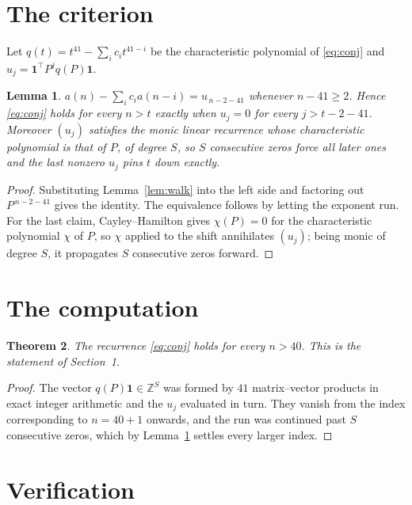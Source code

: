 \documentclass[11pt,a4paper]{article}
\theoremstyle{plain}
\newtheorem{theorem}{Theorem}
\newtheorem{lemma}[theorem]{Lemma}
\theoremstyle{definition}
\begin{document}
\section{The criterion}

Let $q(t)=t^{41}-\sum_i c_i t^{41-i}$ be the characteristic polynomial of
\eqref{eq:conj} and $u_j=\mathbf{1}^{\!\top}P^{j}q(P)\mathbf{1}$.

\begin{lemma}\label{lem:crit}
$a(n)-\sum_i c_i a(n-i)=u_{\,n-2-41}$ whenever $n-41\ge2$. Hence
\eqref{eq:conj} holds for every $n>t$ exactly when $u_j=0$ for every
$j>t-2-41$. Moreover $(u_j)$ satisfies the monic linear recurrence whose
characteristic polynomial is that of $P$, of degree $S$, so $S$ consecutive zeros force all
later ones and the last nonzero $u_j$ pins $t$ down exactly.
\end{lemma}

\begin{proof}
Substituting Lemma~\ref{lem:walk} into the left side and factoring out
$P^{\,n-2-41}$ gives the identity. The equivalence follows by letting the exponent
run. For the last claim, Cayley--Hamilton gives $\chi(P)=0$ for the characteristic
polynomial $\chi$ of $P$, so $\chi$ applied to the shift annihilates $(u_j)$; being monic of
degree $S$, it propagates $S$ consecutive zeros forward.
\end{proof}

\section{The computation}

\begin{theorem}
The recurrence \eqref{eq:conj} holds for every $n>40$. This is the statement of
Section~1.
\end{theorem}

\begin{proof}
The vector $q(P)\mathbf{1}\in\mathbb{Z}^{S}$ was formed by $41$ matrix--vector
products in exact integer arithmetic and the $u_j$ evaluated in turn. They vanish from the
index corresponding to $n=40+1$ onwards, and the run was continued past $S$ consecutive
zeros, which by Lemma~\ref{lem:crit} settles every larger index.
\end{proof}

\section{Verification}
\end{document}
